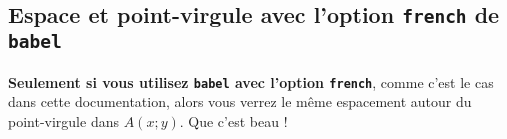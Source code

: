 \documentclass[12pt,a4paper]{article}
\begin{document}

\subsection{Espace et point-virgule avec l'option \texttt{french} de \texttt{babel}}

\textbf{Seulement si vous utilisez \texttt{babel} avec l'option \texttt{french}}, comme c'est le cas dans cette documentation, alors vous verrez le même espacement autour du point-virgule dans $A(x;y)$. Que c'est beau !
\end{document}

